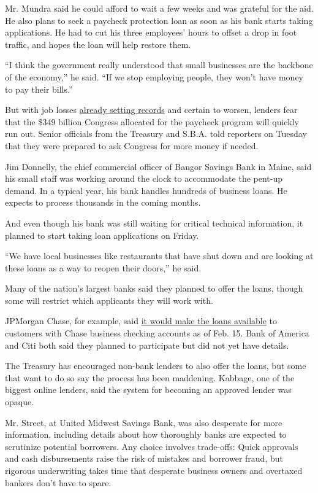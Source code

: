 Mr. Mundra said he could afford to wait a few weeks and was grateful for
the aid. He also plans to seek a paycheck protection loan as soon as his
bank starts taking applications. He had to cut his three employees'
hours to offset a drop in foot traffic, and hopes the loan will help
restore them.

``I think the government really understood that small businesses are the
backbone of the economy,'' he said. ``If we stop employing people, they
won't have money to pay their bills.''

But with job losses
\href{https://www.nytimes3xbfgragh.onion/2020/03/26/business/economy/coronavirus-unemployment-claims.html}{already
setting records} and certain to worsen, lenders fear that the \$349
billion Congress allocated for the paycheck program will quickly run
out. Senior officials from the Treasury and S.B.A. told reporters on
Tuesday that they were prepared to ask Congress for more money if
needed.

Jim Donnelly, the chief commercial officer of Bangor Savings Bank in
Maine, said his small staff was working around the clock to accommodate
the pent-up demand. In a typical year, his bank handles hundreds of
business loans. He expects to process thousands in the coming months.

And even though his bank was still waiting for critical technical
information, it planned to start taking loan applications on Friday.

``We have local businesses like restaurants that have shut down and are
looking at these loans as a way to reopen their doors,'' he said.

Many of the nation's largest banks said they planned to offer the loans,
though some will restrict which applicants they will work with.

JPMorgan Chase, for example, said
\href{https://recovery.chase.com/cares}{it would make the loans
available} to customers with Chase business checking accounts as of Feb.
15. Bank of America and Citi both said they planned to participate but
did not yet have details.

The Treasury has encouraged non-bank lenders to also offer the loans,
but some that want to do so say the process has been maddening. Kabbage,
one of the biggest online lenders, said the system for becoming an
approved lender was opaque.

Mr. Street, at United Midwest Savings Bank, was also desperate for more
information, including details about how thoroughly banks are expected
to scrutinize potential borrowers. Any choice involves trade-offs: Quick
approvals and cash disbursements raise the risk of mistakes and borrower
fraud, but rigorous underwriting takes time that desperate business
owners and overtaxed bankers don't have to spare.

